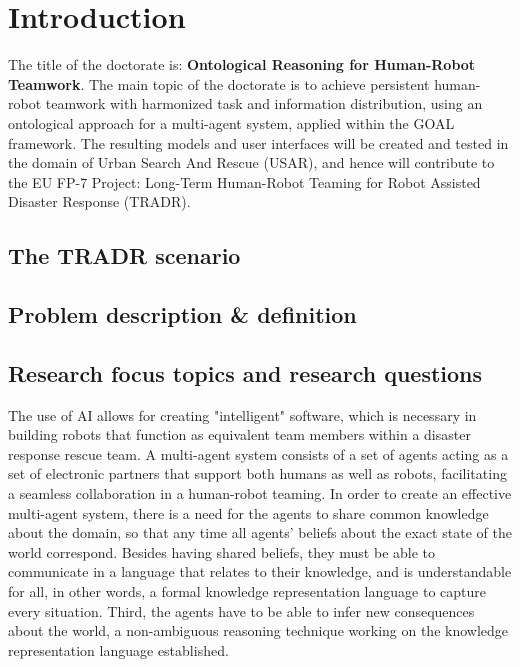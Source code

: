 \chapter{Introduction}
The title of the doctorate is: \textbf{Ontological Reasoning for Human-Robot Teamwork}.
The main topic of the doctorate is to achieve persistent human-robot teamwork with harmonized task and information distribution, using an ontological approach for a multi-agent system, applied within the GOAL framework. The resulting models and user interfaces will be created and tested in the domain of Urban Search And Rescue (USAR), and hence will contribute to the EU FP-7 Project: Long-Term Human-Robot Teaming for Robot Assisted Disaster Response (TRADR).




\section{The TRADR scenario}

\section{Problem description & definition}



\section{Research focus topics and research questions}

The use of AI allows for creating "intelligent" software, which is necessary in building robots that function as equivalent team members within a disaster response rescue team. A multi-agent system consists of a set of agents acting as a set of electronic partners that support both humans as well as robots, facilitating a seamless collaboration in a human-robot teaming. In order to create an effective multi-agent system, there is a need for the agents to share common knowledge about the domain, so that any time all agents' beliefs about the exact state of the world correspond. Besides having shared
beliefs, they must be able to communicate in a language that relates to their knowledge, and is understandable for all, in other words, a formal knowledge representation language to capture every situation. Third, the agents have to be able to infer new consequences about the world, a non-ambiguous reasoning technique working on the knowledge representation language established.

